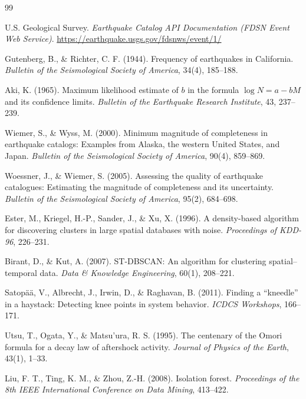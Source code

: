 \documentclass[11pt,a4paper]{article}
\renewcommand{\refname}{เอกสารอ้างอิง}
\begin{document}
\begin{thebibliography}{99}
\addcontentsline{toc}{section}{\refname}
 U.S. Geological Survey. \textit{Earthquake Catalog API Documentation (FDSN Event Web Service)}. \url{https://earthquake.usgs.gov/fdsnws/event/1/}

 Gutenberg, B., \& Richter, C. F. (1944). Frequency of earthquakes in California. \textit{Bulletin of the Seismological Society of America}, 34(4), 185--188.

 Aki, K. (1965). Maximum likelihood estimate of $b$ in the formula $\log N = a - bM$ and its confidence limits. \textit{Bulletin of the Earthquake Research Institute}, 43, 237--239.

 Wiemer, S., \& Wyss, M. (2000). Minimum magnitude of completeness in earthquake catalogs: Examples from Alaska, the western United States, and Japan. \textit{Bulletin of the Seismological Society of America}, 90(4), 859--869.

 Woessner, J., \& Wiemer, S. (2005). Assessing the quality of earthquake catalogues: Estimating the magnitude of completeness and its uncertainty. \textit{Bulletin of the Seismological Society of America}, 95(2), 684--698.

 Ester, M., Kriegel, H.-P., Sander, J., \& Xu, X. (1996). A density-based algorithm for discovering clusters in large spatial databases with noise. \textit{Proceedings of KDD-96}, 226--231.

 Birant, D., \& Kut, A. (2007). ST-DBSCAN: An algorithm for clustering spatial--temporal data. \textit{Data \& Knowledge Engineering}, 60(1), 208--221.

 Satopää, V., Albrecht, J., Irwin, D., \& Raghavan, B. (2011). Finding a ``kneedle'' in a haystack: Detecting knee points in system behavior. \textit{ICDCS Workshops}, 166--171.

 Utsu, T., Ogata, Y., \& Matsu'ura, R. S. (1995). The centenary of the Omori formula for a decay law of aftershock activity. \textit{Journal of Physics of the Earth}, 43(1), 1--33.

 Liu, F. T., Ting, K. M., \& Zhou, Z.-H. (2008). Isolation forest. \textit{Proceedings of the 8th IEEE International Conference on Data Mining}, 413--422.


\end{thebibliography}
\end{document}
